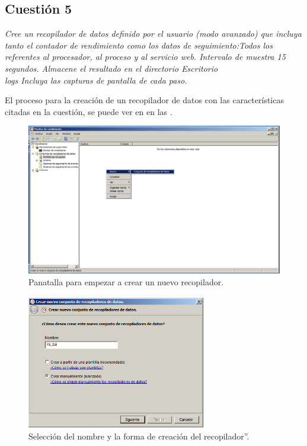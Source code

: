 \subsection{Cuestión 5}
\textit{Cree un recopilador de datos definido por el usuario (modo avanzado) que incluya tanto el contador de rendimiento como los datos de seguimiento:Todos los referentes al procesador, al proceso y al servicio web. Intervalo de muestra 15 segundos. Almacene el resultado en el directorio Escritorio\\logs Incluya las capturas de pantalla de cada paso.}
\newline

El proceso para la creación de un recopilador de datos con las características citadas en la cuestión, se puede ver en en las .

\begin{figure}[H]
  \begin{center}
    \includegraphics[width=1\textwidth]{imagenes/rec1}
    \caption{Panatalla para empezar a crear un nuevo recopilador.}
    \label{fig5}
  \end{center}
\end{figure}

\begin{figure}[H]
  \begin{center}
    \includegraphics[width=0.7\textwidth]{imagenes/rec2}
    \caption{Selección del nombre y la forma de creación del recopilador''.}
    \label{fig6}
  \end{center}
\end{figure}

